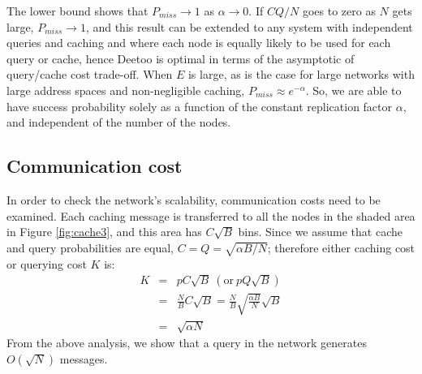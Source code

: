 \documentclass[9.5pt,journal,final,finalsubmission,twocolumn]{IEEEtran}
\begin{document}
The lower bound shows that $P_{miss} \rightarrow 1$ as $\alpha \rightarrow 0$.
If $CQ/N$ goes to zero as $N$ gets large, $P_{miss}\rightarrow 1$,
and this result can be extended to any system with independent queries and
caching and where each node is equally likely to be used for each query or
cache, hence Deetoo is optimal in terms of the asymptotic of query/cache cost
trade-off.
When $E$ is large, as is the case for large networks with large address
spaces and non-negligible caching, $P_{miss}\approx e^{-\alpha}$.
So, we are able to have success probability solely as a function of the 
constant replication factor $\alpha$, and 
independent of the number of the nodes. 

\subsection{Communication cost}
In order to check the network's scalability, communication costs
need to be examined. Each caching message is transferred to all the
nodes in the shaded area in Figure \ref{fig:cache3}, and this area has
$C\sqrt{B}$ bins. Since we assume that cache and query probabilities are
equal, $C = Q = \sqrt{\alpha B/N}$; therefore either caching cost or querying cost $K$ is:
\begin{eqnarray*}\label{th}
K &=& pC\sqrt{B} \  (\mathrm{or}\  pQ\sqrt{B})\\
  &=& \frac{N}{B}C\sqrt{B} = \frac{N}{B}\sqrt{\frac{\alpha B}{N}}\sqrt{B}\\
  &=& \sqrt{\alpha N}
\end{eqnarray*}
From the above analysis, we show that a query in the network
generates $O(\sqrt{N})$ messages.
\end{document}
